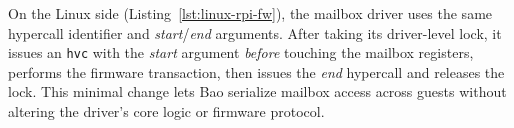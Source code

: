 On the Linux side (Listing~\ref{lst:linux-rpi-fw}), the mailbox driver uses the
same hypercall identifier and \emph{start}/\emph{end} arguments. After taking its
driver-level lock, it issues an \lstinline{hvc} with the \emph{start} argument
\emph{before} touching the mailbox registers, performs the firmware transaction,
then issues the \emph{end} hypercall and releases the lock. This minimal change
lets Bao serialize mailbox access across guests without altering the driver’s
core logic or firmware protocol.

\begin{longlisting}
\centering
\inputminted[]{c}{./listing/linux-rpi-fw.c}
\caption[SSPFS: Linux's Raspberry Pi mailbox driver — patch]{SSPFS: Linux's
  Raspberry Pi mailbox driver — patch (see \lstinline{src/linux-rpi-fw.c}~\cite{thesis-sw-github})}
\label{lst:linux-rpi-fw}
\end{longlisting}

